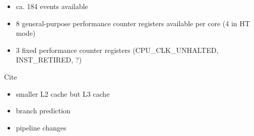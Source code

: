 \label{sec:sandy-bridge-pmu}

\begin{itemize}

\item ca. 184 events available \cite{intel2011events}

\item 8 general-purpose performance counter registers available per core (4 in
      HT mode) \cite{intel2011softdev}

\item 3 fixed performance counter registers (CPU\_CLK\_UNHALTED, INST\_RETIRED,
      ?) \cite{intel2011softdev,intel2011events}

\end{itemize}



Cite \cite{fog11}

\begin{itemize}

\item smaller L2 cache but L3 cache

\item branch prediction

\item pipeline changes

\end{itemize}
